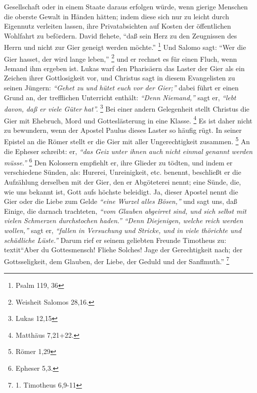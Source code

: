 Gesellschaft oder in einem Staate daraus erfolgen würde, wenn gierige Menschen
die oberste Gewalt in Händen hätten; indem diese sich nur zu leicht durch
Eigennutz verleiten lassen, ihre Privatabsichten auf Kosten der öffentlichen
Wohlfahrt zu befördern. David flehete,
"`daß sein Herz zu den Zeugnissen des
Herrn und nicht zur Gier geneigt werden möchte."'
\footnote{Psalm 119, 36}
Und
Salomo sagt:
"`Wer die Gier hasset, der wird lange leben,"'
\footnote{Weisheit Salomos 28,16.}
und er rechnet es für einen Fluch, wenn Jemand ihm ergeben ist. Lukas
warf den Pharisäern das Laster der Gier als ein Zeichen ihrer Gottlosigkeit
vor, und Christus sagt in diesem Evangelisten zu seinen Jüngern:
\textit{"`Gehet zu und
hütet euch vor der Gier;"'} dabei führt er einen Grund an, der trefflichen
Unterricht enthält: \textit{"`Denn Niemand,"'} sagt er,
\textit{"`lebt davon, daß er viele Güter hat"'.}
\footnote{Lukas 12,15}
Bei einer andern Gelegenheit stellt Christus die Gier mit Ehebruch, Mord und Gotteslästerung in eine Klasse.
\footnote{Matthäus 7,21+22.}
Es ist daher nicht zu bewundern, wenn der Apostel Paulus dieses
Laster so häufig rügt. In seiner Epistel an die Römer stellt er die Gier mit
aller Ungerechtigkeit zusammen.
\footnote{Römer 1,29}
An die Epheser schreibt: er,
\textit{"`das Geiz unter ihnen auch nicht einmal genannt werden müsse."'}
\footnote{Epheser 5,3.}
Den Kolossern empfiehlt er, ihre Glieder zu tödten, und indem er
verschiedene Sünden, als: Hurerei, Unreinigkeit, etc. benennt, beschließt er
die Aufzählung derselben mit der Gier, den er Abgöteterei nennt; eine Sünde,
die, wie uns bekannt ist, Gott aufs höchste beleidigt. Ja, dieser Apostel nennt
die Gier oder die Liebe zum Gelde \textit{"`eine Wurzel alles Bösen,"'} und sagt uns, daß
Einige, die darnach trachteten, \textit{"`vom Glauben abgeirret sind, und sich selbst
mit vielen Schmerzen durchstochen haden."'} \textit{"`Denn Diejenigen, welche reich
werden wollen,"'} sagt er, \textit{"`fallen in Versuchung und Stricke, und in viele
thörichte und schädliche Lüste."'} Darum rief er seinem geliebten Freunde
Timotheus zu:\\textit{"`Aber du Gottesmensch! Fliehe Solches! Jage der Gerechtigkeit
nach; der Gottsseligkeit, dem Glauben, der Liebe, der Geduld und der
Sanflmuth."'}
\footnote{1. Timotheus 6,9-11}

